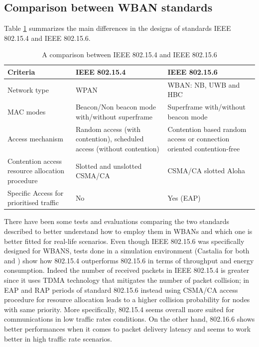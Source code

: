 \documentclass[conference]{IEEEtran}
\begin{document}
\subsection{Comparison between WBAN standards}
Table \ref{tab2} \cite{salayma2017wireless} summarizes the main differences in the designs of standards IEEE 802.15.4 and IEEE 802.15.6.

\begin{table}[htbp]
	\caption{A comparison between IEEE 802.15.4 and IEEE 802.15.6}
	\begin{tabularx}{0.5\textwidth}{X|X|X|}
		\textbf{Criteria} & \textbf{IEEE 802.15.4} & \textbf{IEEE 802.15.6} \\
		\hline
		Network type & WPAN &  WBAN: NB, UWB and HBC\\
		\hline
		MAC modes &  Beacon/Non beacon mode with/without superframe & Superframe with/without beacon mode \\
		\hline
		Access mechanism &  Random access (with contention), scheduled access (without contention) & Contention based random access or connection oriented contention-free \\
		\hline
		Contention access resource allocation procedure	& Slotted and unslotted CSMA/CA & CSMA/CA slotted Aloha \\
		\hline
		Specific Access for prioritised traffic & No & Yes (EAP) \\
		\hline
	\end{tabularx}
	\label{tab2}
\end{table}

There have been some tests and evaluations comparing the two standards described to better understand how to employ them in WBANs and which one is better fitted for real-life scenarios. Even though IEEE 802.15.6 was specifically designed for WBANS, tests done in a simulation environment (Castalia for both \cite{nabila2019qos} and \cite{toumanari2014performance}) show how 802.15.4 outperforms 802.15.6 in terms of throughput and energy consumption. Indeed the number of received packets in IEEE 802.15.4 is greater since it uses TDMA technology that mitigates the
number of packet collision; in EAP and RAP periods of standard 802.15.6 instead using CSMA/CA access procedure for resource allocation leads to a higher collision probability for nodes with same priority. More specifically, 802.15.4 seems overall more suited for communications in low traffic rates conditions. On the other hand, 802.16.6 shows better performances when it comes to packet delivery latency and seems to work better in high traffic rate scenarios.
\end{document}
